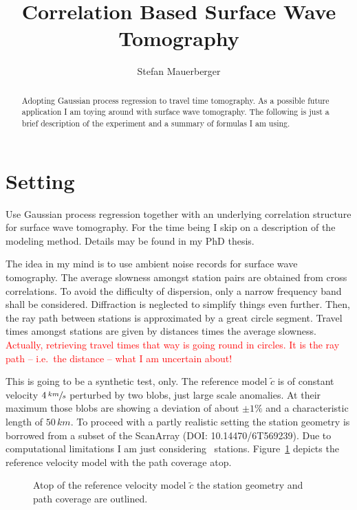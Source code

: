 \documentclass[11pt]{article}
\title{Correlation Based Surface Wave Tomography}
\author{Stefan Mauerberger}
\newcommand\worries[1]{\textcolor{red}{#1}}
\begin{document}
\maketitle
\begin{abstract}
    Adopting Gaussian process regression to travel time tomography.
    As a possible future application I am toying around with surface wave tomography.
    The following is just a brief description of the experiment and a summary of formulas I am using.
\end{abstract}

\section{Setting}


Use Gaussian process regression together with an underlying correlation structure for surface wave tomography.
For the time being I skip on a description of the modeling method.
Details may be found in my PhD thesis.

The idea in my mind is to use ambient noise records for surface wave tomography.
The average slowness amongst station pairs are obtained from cross correlations.
To avoid the difficulty of dispersion, only a narrow frequency band shall be considered.
Diffraction is neglected to simplify things even further.
Then, the ray path between stations is approximated by a great circle segment.
Travel times amongst stations are given by distances times the average slowness.
\worries{Actually, retrieving travel times that way is going round in circles.
It is the ray path -- i.e.~the distance -- what I am uncertain about!}

This is going to be a synthetic test, only.
The reference model $\tilde c$ is of constant velocity $4\,\sfrac{km}s$ perturbed by two blobs, just large scale anomalies.
At their maximum those blobs are showing a deviation of about $\pm 1\%$ and a characteristic length of $50\,km$.
To proceed with a partly realistic setting the station geometry is borrowed from a subset of the ScanArray (DOI: 10.14470/6T569239).
Due to computational limitations I am just considering \SFWnobs\ stations.
Figure~\ref{fig:path_coverage} depicts the reference velocity model with the path coverage atop.

\begin{figure}
    \centering
    
    \caption{Atop of the reference velocity model $\tilde c$ the station geometry and path coverage are outlined. }
    \label{fig:path_coverage}
\end{figure}
\end{document}

